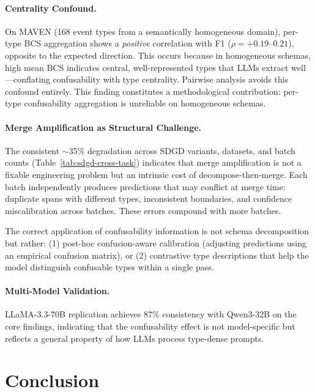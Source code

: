 \documentclass[11pt,a4paper]{article}
\begin{document}
\paragraph{Centrality Confound.}
On MAVEN (168 event types from a semantically homogeneous domain), per-type BCS aggregation shows a \emph{positive} correlation with F1 ($\rho{=}{+}0.19$--$0.21$), opposite to the expected direction.
This occurs because in homogeneous schemas, high mean BCS indicates central, well-represented types that LLMs extract well---conflating confusability with type centrality.
Pairwise analysis avoids this confound entirely.
This finding constitutes a methodological contribution: per-type confusability aggregation is unreliable on homogeneous schemas.

\paragraph{Merge Amplification as Structural Challenge.}
The consistent $\sim$35\% degradation across SDGD variants, datasets, and batch counts (Table~\ref{tab:sdgd-cross-task}) indicates that merge amplification is not a fixable engineering problem but an intrinsic cost of decompose-then-merge.
Each batch independently produces predictions that may conflict at merge time: duplicate spans with different types, inconsistent boundaries, and confidence miscalibration across batches.
These errors compound with more batches.

The correct application of confusability information is not schema decomposition but rather: (1) post-hoc confusion-aware calibration (adjusting predictions using an empirical confusion matrix), or (2) contrastive type descriptions that help the model distinguish confusable types within a single pass.

\paragraph{Multi-Model Validation.}
LLaMA-3.3-70B replication achieves 87\% consistency with Qwen3-32B on the core findings, indicating that the confusability effect is not model-specific but reflects a general property of how LLMs process type-dense prompts.

\section{Conclusion}
\end{document}
